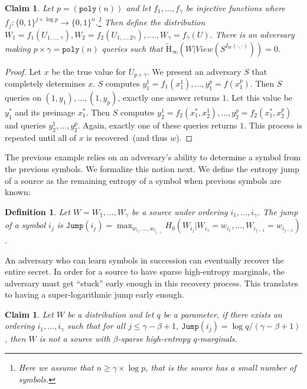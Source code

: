 \documentclass[11pt]{article}
\newtheorem{definition}[theorem]{Definition}
\newtheorem{claim}[theorem]{Claim}
\newcommand{\zo}{\ensuremath{\{0, 1\}}}
\newcommand{\poly}{\ensuremath{\mathtt{poly}}\xspace}
\newcommand{\Hav}{\tilde{\mathrm{H}}_\infty}
\begin{document}
\begin{claim}
Let $p = (\poly(n))$ and let $f_1,..., f_{\gamma}$ be injective functions where $f_j:\zo^{j\times \log p}\rightarrow \zo^n$.\footnote{Here we assume that $n\ge \gamma \times \log p$, that is the source has a small number of symbols.}  Then define the distribution $W_1 = f_1(U_{1,...,\gamma}), W_2 = f_2(U_{1,..., 2\gamma}),...., W_\gamma = f_\gamma(U)$.  There is an adversary making $p\times \gamma = \poly(n)$ queries such that $\Hav(W | View(S^{I_W(\cdot, \cdot)})) = 0$.
\end{claim}
\begin{proof}
Let $x$ be the true value for $U_{p\times \gamma}$.
We present an adversary $S$ that completely determines $x$.  $S$ computes $y_1^1 = f_1(x_1^1),..., y_1^p = f(x_1^p)$.  Then $S$ queries on $(1, y_1),..., (1, y_p)$, exactly one answer returns $1$.  Let this value be $y_1^*$ and its preimage $x_1^*$.  Then $S$ computes $y_2^1 = f_2(x_1^*,x_2^1), ..., y_2^p= f_2(x_1^*, x_2^p)$ and queries $y_2^1,..., y_2^p$.  Again, exactly one of these queries returns $1$.  This process is repeated until all of $x$ is recovered~(and thus $w$).  %
\end{proof}

The previous example relies on an adversary's ability to determine a symbol from the previous symbols.  We formalize this notion next.  We define the entropy jump of a source as the remaining entropy of a symbol when previous symbols are known:

\begin{definition}
Let $W = W_1,..., W_\gamma$ be a source under ordering $i_1,..., i_\gamma$.  The \emph{jump} of a symbol $i_j$ is $\mathtt{Jump}(i_j) = \max_{w_{i_1},..., w_{i_{j-1}}} H_0 (W_{i_j} | W_{i_1} = w_{i_1} ,..., W_{i_{j-1}} = w_{i_{j-1}})$.
\end{definition}

An adversary who can learn symbols in succession  can eventually recover the entire secret.  In order for a source to have sparse high-entropy marginals, the adversary must get ``stuck'' early enough in this recovery process.  This translates to having a super-logarithmic jump early enough.

\begin{claim}
Let $W$ be a distribution and let $q$ be a parameter, if there exists an ordering $i_1,..., i_\gamma$ such that for all $j\le \gamma-\beta +1$, $\mathtt{Jump}(i_j) = \log q /(\gamma-\beta+1)$, then $W$ is not a  source with $\beta$-sparse high-entropy $q$-marginals.
\end{claim}
\end{document}
